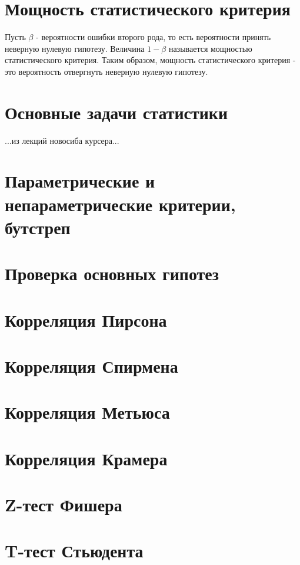 \section{Мощность статистического критерия}

Пусть $\beta$ - вероятности ошибки второго рода, то есть вероятности принять неверную нулевую гипотезу. Величина $1 - \beta$ называется мощностью статистического критерия. Таким образом, мощность статистического критерия - это вероятность отвергнуть неверную нулевую гипотезу.

\section{Основные задачи статистики}

...из лекций новосиба  курсера...


\section{Параметрические и непараметрические критерии, бутстреп}


\section{Проверка основных гипотез}


\section{Корреляция Пирсона}


\section{Корреляция Спирмена}


\section{Корреляция Метьюса}


\section{Корреляция Крамера}


\section{Z-тест Фишера}


\section{T-тест Стьюдента}


